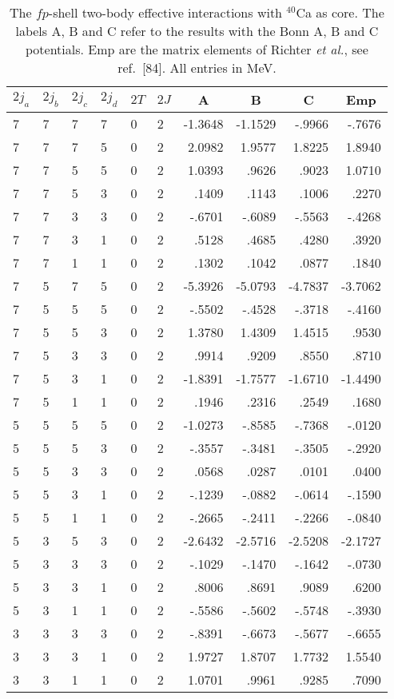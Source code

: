 \begin{table}[hbtp]
\caption{The $fp$-shell two-body effective interactions 
with $^{40}$Ca as core.
The labels A, B and C refer to the results with the Bonn A, B and
C potentials. Emp are the matrix elements of Richter {\em et al.},
see ref.\ [84].
All entries in MeV.}
\small
\begin{center}
\begin{tabular}{llllllrrrr}
\hline
$2j_{a}$&$2j_{b}$&$2j_{c}$&$2j_{d}$&$2T$&$2J$&
\multicolumn{1}{c}{A}&
\multicolumn{1}{c}{B}&
\multicolumn{1}{c}{C}&
\multicolumn{1}{c}{Emp}
\\\hline
  7& 7& 7& 7& 0& 2& -1.3648& -1.1529&  -.9966&  -.7676\\
  7& 7& 7& 5& 0& 2&  2.0982&  1.9577&  1.8225&  1.8940\\
  7& 7& 5& 5& 0& 2&  1.0393&   .9626&   .9023&  1.0710\\
  7& 7& 5& 3& 0& 2&   .1409&   .1143&   .1006&   .2270\\
  7& 7& 3& 3& 0& 2&  -.6701&  -.6089&  -.5563&  -.4268\\
  7& 7& 3& 1& 0& 2&   .5128&   .4685&   .4280&   .3920\\
  7& 7& 1& 1& 0& 2&   .1302&   .1042&   .0877&   .1840\\
  7& 5& 7& 5& 0& 2& -5.3926& -5.0793& -4.7837& -3.7062\\
  7& 5& 5& 5& 0& 2&  -.5502&  -.4528&  -.3718&  -.4160\\
  7& 5& 5& 3& 0& 2&  1.3780&  1.4309&  1.4515&   .9530\\
  7& 5& 3& 3& 0& 2&   .9914&   .9209&   .8550&   .8710\\
  7& 5& 3& 1& 0& 2& -1.8391& -1.7577& -1.6710& -1.4490\\
  7& 5& 1& 1& 0& 2&   .1946&   .2316&   .2549&   .1680\\
  5& 5& 5& 5& 0& 2& -1.0273&  -.8585&  -.7368&  -.0120\\
  5& 5& 5& 3& 0& 2&  -.3557&  -.3481&  -.3505&  -.2920\\
  5& 5& 3& 3& 0& 2&   .0568&   .0287&   .0101&   .0400\\
  5& 5& 3& 1& 0& 2&  -.1239&  -.0882&  -.0614&  -.1590\\
  5& 5& 1& 1& 0& 2&  -.2665&  -.2411&  -.2266&  -.0840\\
  5& 3& 5& 3& 0& 2& -2.6432& -2.5716& -2.5208& -2.1727\\
  5& 3& 3& 3& 0& 2&  -.1029&  -.1470&  -.1642&  -.0730\\
  5& 3& 3& 1& 0& 2&   .8006&   .8691&   .9089&   .6200\\
  5& 3& 1& 1& 0& 2&  -.5586&  -.5602&  -.5748&  -.3930\\
  3& 3& 3& 3& 0& 2&  -.8391&  -.6673&  -.5677&  -.6655\\
  3& 3& 3& 1& 0& 2&  1.9727&  1.8707&  1.7732&  1.5540\\
  3& 3& 1& 1& 0& 2&  1.0701&   .9961&   .9285&   .7090\\
\hline
\end{tabular}
\end{center}
\label{tab:fpveff}
\end{table}
